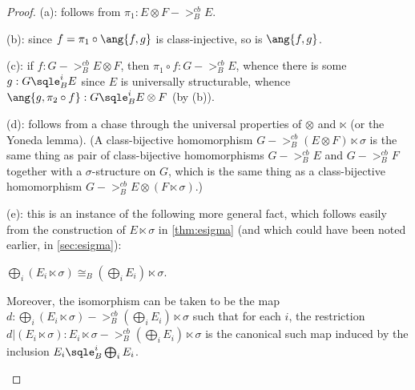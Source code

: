 \documentclass[11pt]{article}
\begin{document}
\begin{proof}
(a): follows from $\pi_1 : E \otimes F ->_B^{cb} E$.

(b): since $f = \pi_1 \circ \ang{f, g}$ is class-injective, so is $\ang{f, g}$.

(c): if $f : G ->_B^{cb} E \otimes F$, then $\pi_1 \circ f : G ->_B^{cb} E$, whence there is some $g : G \sqle_B^i E$ since $E$ is universally structurable, whence $\ang{g, \pi_2 \circ f} : G \sqle_B^i E \otimes F$ (by (b)).

(d): follows from a chase through the universal properties of $\otimes$ and $\ltimes$ (or the Yoneda lemma).  (A class-bijective homomorphism $G ->_B^{cb} (E \otimes F) \ltimes \sigma$ is the same thing as pair of class-bijective homomorphisms $G ->_B^{cb} E$ and $G ->_B^{cb} F$ together with a $\sigma$-structure on $G$, which is the same thing as a class-bijective homomorphism $G ->_B^{cb} E \otimes (F \ltimes \sigma)$.)

(e): this is an instance of the following more general fact, which follows easily from the construction of $E \ltimes \sigma$ in \cref{thm:esigma} (and which could have been noted earlier, in \cref{sec:esigma}):
\begin{proposition}
\label{thm:esigma-dist}
$\bigoplus_i (E_i \ltimes \sigma) \cong_B (\bigoplus_i E_i) \ltimes \sigma$.

Moreover, the isomorphism can be taken to be the map $d : \bigoplus_i (E_i \ltimes \sigma) ->_B^{cb} (\bigoplus_i E_i) \ltimes \sigma$ such that for each $i$, the restriction $d|(E_i \ltimes \sigma) : E_i \ltimes \sigma ->_B^{cb} (\bigoplus_i E_i) \ltimes \sigma$ is the canonical such map induced by the inclusion $E_i \sqle_B^i \bigoplus_i E_i$.


\end{proposition}
\end{proof}
\end{document}
